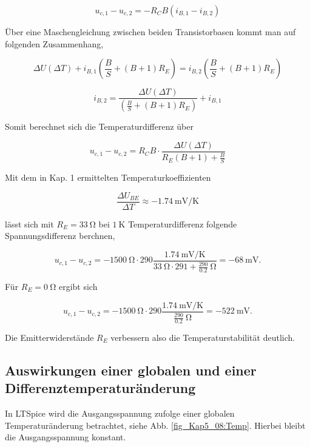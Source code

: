 \begin{equation}
    u_{c,1} - u_{c,2} = -R_C B ( i_{B,1} - i_{B,2} )
\end{equation}

Über eine Maschengleichung zwischen beiden Transistorbasen kommt man auf folgenden Zusammenhang,

\begin{equation}
    \Delta U(\Delta T) + i_{B,1}(\frac{B}{S} + (B + 1)R_E) = i_{B,2} (\frac{B}{S} + (B + 1)R_E)
\end{equation}

\begin{equation}
    i_{B,2} = \frac{\Delta U(\Delta T)}{(\frac{B}{S} + (B + 1)R_E)} + i_{B,1}
\end{equation}

Somit berechnet sich die Temperaturdifferenz über

\begin{equation}
    u_{c,1} - u_{c,2} = R_C B \cdot \frac{\Delta U(\Delta T)}{R_E(B+1) + \frac{B}{S}}
\end{equation}

Mit dem in Kap. 1 ermittelten Temperaturkoeffizienten 

\begin{equation}
    \frac{\Delta U_{BE}}{\Delta T} \approx -\SI{1,74}{\milli\volt\per\kelvin}
\end{equation}

lässt sich mit $R_E = \SI{33}{\ohm}$ bei $\SI{1}{\kelvin}$ Temperaturdifferenz folgende Spannungsdifferenz berchnen,

\begin{equation}
    u_{c,1} - u_{c,2} = -\SI{1500}{\ohm} \cdot 290  \frac{\SI{1,74}{\milli\volt\per\kelvin}}{\SI{33}{\ohm} \cdot 291 + \frac{290}{0.2}\SI{}{\ohm}} = -\SI{68}{\milli\volt} .
\end{equation}

Für $R_E = \SI{0}{\ohm}$ ergibt sich

\begin{equation}
    u_{c,1} - u_{c,2} = -\SI{1500}{\ohm} \cdot 290  \frac{\SI{1,74}{\milli\volt\per\kelvin}}{\frac{290}{0.2}\SI{}{\ohm}} = -\SI{522}{\milli\volt} .
\end{equation}

Die Emitterwiderstände $R_E$ verbessern also die Temperaturstabilität deutlich.

\subsection{Auswirkungen einer globalen und einer Differenztemperaturänderung}
In LTSpice wird die Ausgangsspannung zufolge einer globalen Temperaturänderung betrachtet, siehe Abb. \ref{fig_Kap5_08:Temp}. Hierbei bleibt die Ausgangsspannung konstant.

